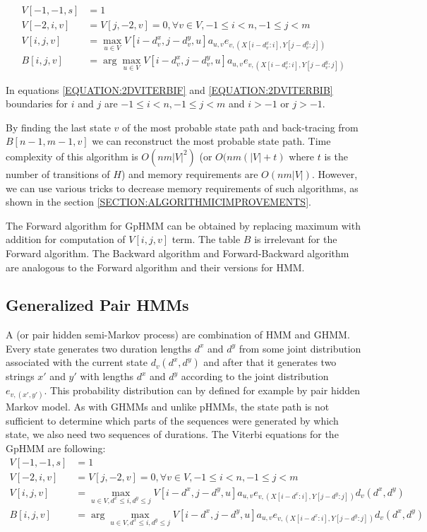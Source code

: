\begin{align}
V[-1,-1,s] &= 1\\
V[-2,i,v] &= V[j,-2,v] = 0, \forall v\in V,-1 \leq i < n, -1\leq j < m\\
V[i,j,v] &= \max_{u\in
V}V[i-d^x_{v},j-d^y_v,u]a_{u,v}e_{v,(X[i-d^x_v:i],Y[j-d^y_v:j])}\label{EQUATION:2DVITERBIF}\\
B[i,j,v] &= \arg\max_{u\in
V}V[i-d^x_{v},j-d^y_v,u]a_{u,v}e_{v,(X[i-d^x_v:i],Y[j-d^y_v:j])}\label{EQUATION:2DVITERBIB}
\end{align}

In equations \ref{EQUATION:2DVITERBIF} and \ref{EQUATION:2DVITERBIB} boundaries for $i$ and $j$ are $
-1\leq i< n,-1\leq j< m$ and $i>-1$ or $j>-1$.


By finding the last state $v$ of the most probable state path and back-tracing
from $B[n-1,m-1,v]$ we can reconstruct the most probable state path. Time
complexity of this algorithm is $O(nm|V|^2)$ (or $O(nm(|V|+t)$ where $t$ is the
number of transitions of $H$) and memory requirements are $O(nm|V|)$. However,
we can use various tricks to decrease memory requirements of such algorithms, as
shown in the section \ref{SECTION:ALGORITHMICIMPROVEMENTS}.

The Forward algorithm for GpHMM can be obtained by replacing maximum with
addition for computation of $V[i,j,v]$ term. The table $B$ is irrelevant for
the Forward algorithm. The Backward algorithm and Forward-Backward algorithm
are analogous to the Forward algorithm and their versions for HMM.

\subsection{Generalized Pair HMMs}\label{SECTION:GPHMM}


A  (or pair hidden semi-Markov
process) are combination of HMM and GHMM. Every state generates two
duration lengths $d^x$ and $d^y$ from some joint distribution associated with
the current state $d_v(d^x,d^y)$ and after that it generates two strings $x'$
and $y'$ with lengths $d^x$ and $d^y$ according to the joint distribution
$e_{v,(x',y')}$. This probability distribution can by defined for example by
pair hidden Markov model.  As with GHMMs and unlike pHMMs, the state path is not
sufficient to determine which parts of the sequences were generated by which
state, we also need two sequences of durations.
The Viterbi equations for the GpHMM are following:
\begin{align}
V[-1,-1,s] &= 1\\
V[-2,i,v] &= V[j,-2,v] = 0, \forall v\in V,-1 \leq i < n, -1\leq j < m\\
V[i,j,v] &= \max_{u\in
V,d^x\leq i, d^y\leq j}V[i-d^x,j-d^y,u]a_{u,v}e_{v,(X[i-d^x:i],Y[j-d^y:j])}d_v(d^x,d^y)\label{EQUATION:2DVITERBIFGP}\\
B[i,j,v] &= \arg\max_{u\in
V,d^x\leq i, d^y\leq j}V[i-d^x,j-d^y,u]a_{u,v}e_{v,(X[i-d^x:i],Y[j-d^y:j])}d_v(d^x,d^y)\label{EQUATION:2DVITERBIBGP}
\end{align}

